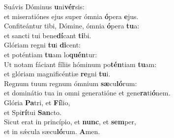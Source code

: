 \evenverse Suávis Dóminus \textbf{u}ni\textbf{vér}sis:~\*\\
\evenverse et miseratiónes ejus super ómnia \textbf{ó}pera \textbf{e}jus.\\
\oddverse Confiteántur tibi, Dómine, ómnia \textbf{ó}pera \textbf{tu}a:~\*\\
\oddverse et sancti tui bene\textbf{dí}cant \textbf{ti}bi.\\
\evenverse Glóriam regni \textbf{tu}i \textbf{di}cent:~\*\\
\evenverse et poténtiam \textbf{tu}am lo\textbf{quén}tur:\\
\oddverse Ut notam fáciant fíliis hóminum po\textbf{tén}tiam \textbf{tu}am:~\*\\
\oddverse et glóriam magnificéntiæ \textbf{re}gni \textbf{tu}i.\\
\evenverse Regnum tuum regnum ómnium \textbf{sæ}cu\textbf{ló}rum:~\*\\
\evenverse et dominátio tua in omni generatióne et gene\textbf{ra}ti\textbf{ó}nem.\\
\oddverse Glória \textbf{Pa}tri, et \textbf{Fí}lio,~\*\\
\oddverse et Spi\textbf{rí}tui \textbf{San}cto.\\
\evenverse Sicut erat in princípio, et \textbf{nunc}, et \textbf{sem}per,~\*\\
\evenverse et in sǽcula sæcu\textbf{ló}rum. \textbf{A}men.\\
